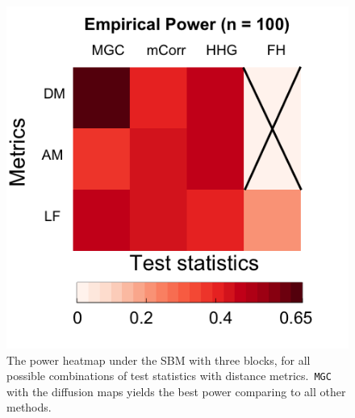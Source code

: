 \documentclass[11pt]{article}
\theoremstyle{definition}
\begin{document}
\begin{figure}
	\centering
	\includegraphics[width=0.4\paperwidth, height=0.4\paperwidth]{ThreeSBM.png}
	\caption{The power heatmap under the SBM with three blocks, for all possible combinations of test statistics with distance metrics.~\texttt{MGC} with the diffusion maps yields the best power comparing to all other methods.}
	\label{fig:threeSBM}
\end{figure}
\end{document}

